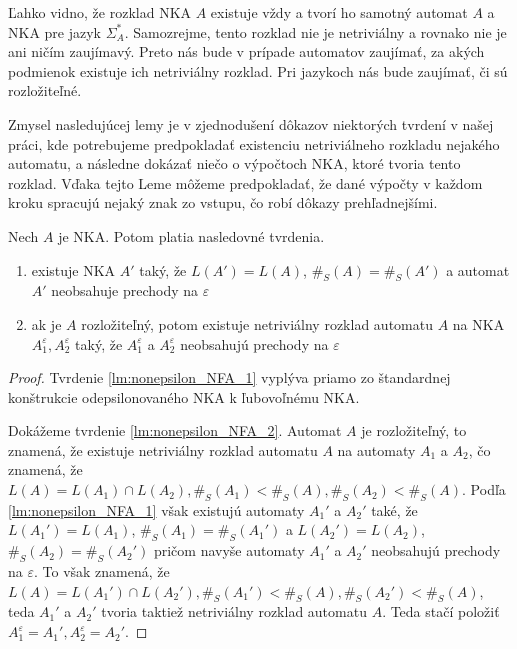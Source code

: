 Ľahko vidno, že rozklad NKA $ A $ existuje vždy a tvorí ho samotný automat $ A $ a NKA pre jazyk $ \Sigma_A^{*} $. Samozrejme, tento rozklad nie je netriviálny a rovnako nie je ani ničím zaujímavý. Preto nás bude v prípade automatov zaujímať, za akých podmienok existuje ich netriviálny rozklad. Pri jazykoch nás bude zaujímať, či sú rozložiteľné.
\par
Zmysel nasledujúcej lemy je v zjednodušení dôkazov niektorých tvrdení v našej práci, kde potrebujeme predpokladať existenciu netriviálneho rozkladu nejakého automatu, a následne dokázať niečo o výpočtoch NKA, ktoré tvoria tento rozklad. Vďaka tejto Leme môžeme predpokladať, že dané výpočty v každom kroku spracujú nejaký znak zo vstupu, čo robí dôkazy prehľadnejšími.

\begin{lemma}
\label{lm:nonepsilon_NFA}
Nech $ A $ je NKA. Potom platia nasledovné tvrdenia.

\begin{enumerate}[label=(\alph*)]
\item \label{lm:nonepsilon_NFA_1} existuje NKA $ A' $ taký, že $ L(A')=L(A) $, $ \#_S(A)=\#_S(A') $ a automat $ A' $ neobsahuje prechody na $ \varepsilon $
\item \label{lm:nonepsilon_NFA_2} ak je $ A $ rozložiteľný, potom existuje netriviálny rozklad automatu $ A $ na NKA $ A_1^{\varepsilon}, A_2^{\varepsilon} $ taký, že $ A_1^{\varepsilon} $ a $ A_2^{\varepsilon} $ neobsahujú prechody na $ \varepsilon $
\end{enumerate}
\end{lemma}

\begin{proof}
Tvrdenie \ref{lm:nonepsilon_NFA_1} vyplýva priamo zo štandardnej konštrukcie odepsilonovaného NKA k ľubovoľnému NKA.
\par
Dokážeme tvrdenie \ref{lm:nonepsilon_NFA_2}. Automat $ A $ je rozložiteľný, to znamená, že existuje netriviálny rozklad automatu $ A $ na automaty $ A_1 $ a $ A_2 $, čo znamená, že $ L(A) = L(A_1) \cap L(A_2), \#_S(A_1) < \#_S(A), \#_S(A_2) < \#_S(A) $. Podľa \ref{lm:nonepsilon_NFA_1} však existujú automaty $ A_1' $ a $ A_2' $ také, že $ L(A_1')=L(A_1) $, $ \#_S(A_1)=\#_S(A_1') $ a $ L(A_2')=L(A_2) $, $ \#_S(A_2)=\#_S(A_2') $ pričom navyše automaty $ A_1' $ a $ A_2' $ neobsahujú prechody na $ \varepsilon $. To však znamená, že $ L(A) = L(A_1') \cap L(A_2'), \#_S(A_1') < \#_S(A), \#_S(A_2') < \#_S(A) $, teda $ A_1' $ a $ A_2' $ tvoria taktiež netriviálny rozklad automatu $ A $. Teda stačí položiť $ A_1^{\varepsilon} = A_1', A_2^{\varepsilon} = A_2'$.
\end{proof}

